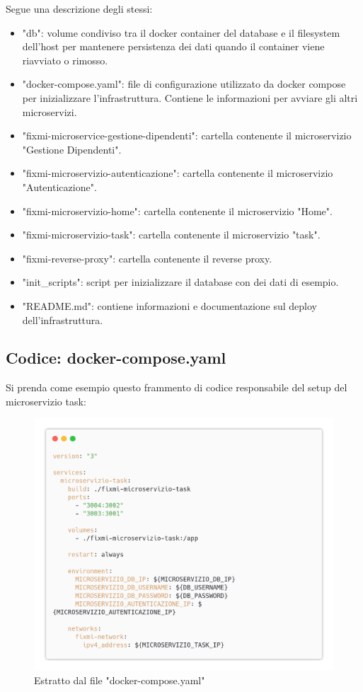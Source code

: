 \documentclass{report}
\begin{document}
Segue una descrizione degli stessi:
\begin{itemize}
	\item "db": volume condiviso tra il docker container del database e il filesystem dell'host per mantenere persistenza dei dati quando il container viene riavviato o rimosso.
	\item "docker-compose.yaml": file di configurazione utilizzato da docker compose per inizializzare l'infrastruttura. Contiene le informazioni per avviare gli altri microservizi.
	\item "fixmi-microservice-gestione-dipendenti": cartella contenente il microservizio "Gestione Dipendenti".
	\item "fixmi-microservizio-autenticazione": cartella contenente il microservizio "Autenticazione".
	\item "fixmi-microservizio-home": cartella contenente il microservizio "Home".
	\item "fixmi-microservizio-task": cartella contenente il microservizio "task".
	\item "fixmi-reverse-proxy": cartella contenente il reverse proxy.
	\item "init\_scripts": script per inizializzare il database con dei dati di esempio.
	\item "README.md": contiene informazioni e documentazione sul deploy dell'infrastruttura.
\end{itemize}

\subsection{Codice: docker-compose.yaml}

Si prenda come esempio questo frammento di codice responsabile del setup del microservizio task:
\begin{figure}[H]
	\centering\includegraphics[width=1\textwidth]{images/docker_code_01.png}
	Estratto dal file "docker-compose.yaml"
\end{figure}
\end{document}
